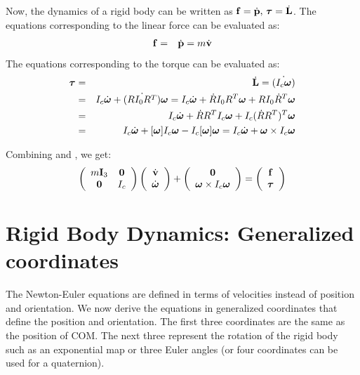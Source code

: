 Now, the dynamics of a rigid body can be written as $\mathbf{f} = \dot{\mathbf{p}} \mbox{,\ } \bm{\tau} = \dot{\mathbf{L}}$. The equations corresponding to the linear force can be evaluated as:
\begin{eqnarray}
\label{eq:force}
\mathbf{f} & = & \dot{\mathbf{p}} = m \dot{\mathbf{v}}
\end{eqnarray}
The equations corresponding to the torque can be evaluated as:
\begin{eqnarray}
\label{eq:torque}
\nonumber
\bm{\tau} & = & \dot{\mathbf{L}} = \dot{(I_c \bm{\omega})} \\
\nonumber
& = & I_c\dot{\bm{\omega}} + \dot{(RI_0 R^T)}\bm{\omega} = I_c\dot{\bm{\omega}} + \dot{R}I_0 R^T\bm{\omega} + R I_0 \dot{R}^T\bm{\omega}\\
\nonumber
& = & I_c\dot{\bm{\omega}} + \dot{R}R^T I_c \bm{\omega} + I_c (\dot{R}R^T)^T\bm{\omega} \\
& = & I_c\dot{\bm{\omega}} + [\bm{\omega}]I_c \bm{\omega} - I_c[\bm{\omega}]\bm{\omega} = I_c\dot{\bm{\omega}} + \bm{\omega} \times I_c \bm{\omega}
\end{eqnarray}

Combining  and , we get:
\begin{equation}
\label{eq:newtoneuler}
\left(
\begin{array}{cc}
m\mathbf{I}_3 & \mathbf{0} \\
\mathbf{0} & I_c 
\end{array}
\right)
\left(
\begin{array}{c}
\dot{\mathbf{v}} \\
\dot{\bm{\omega}} 
\end{array}
\right) +
\left(
\begin{array}{c}
\mathbf{0}  \\
\bm{\omega} \times I_c \bm{\omega} 
\end{array}
\right) = 
\left(
\begin{array}{c}
\mathbf{f} \\
\bm{\tau} 
\end{array}
\right)
\end{equation}

\section{Rigid Body Dynamics: Generalized coordinates}
\label{sec:rigidbodydyngen}
The Newton-Euler equations are defined in terms of velocities instead of position and orientation. We now derive the equations in generalized coordinates  that define the position and orientation. The first three coordinates are the same as the position of COM. The next three represent the rotation of the rigid body such as an exponential map or three Euler angles (or four coordinates can be used for a quaternion).

